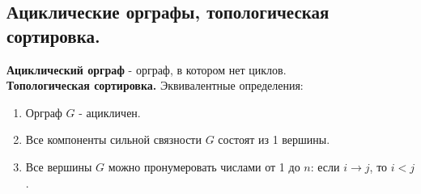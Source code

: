 \subsection{Ациклические орграфы, топологическая сортировка.}
\textbf{Ациклический орграф} - орграф, в котором нет циклов.\\

\textbf{Топологическая сортировка.}
Эквивалентные определения:

\begin{enumerate}
    \item Орграф $G$ - ацикличен.
    \item Все компоненты сильной связности $G$ состоят из 1 вершины.
    \item Все вершины $G$ можно пронумеровать числами от 1 до $n$: если $i \to j$, то $i < j$.
\end{enumerate}